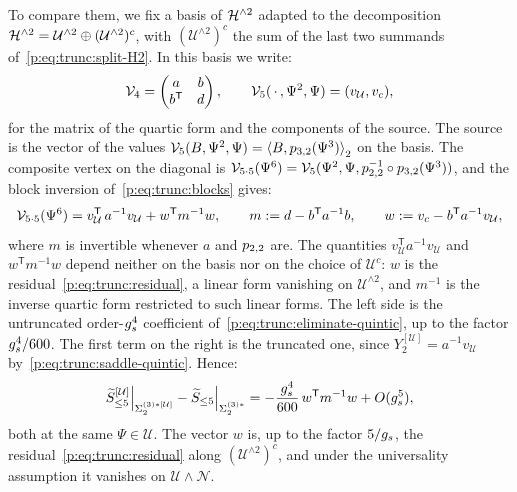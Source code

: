 To compare them, we fix a basis of $\Hn{2}$ adapted to the decomposition $\Hn{2} = \mathcal U^{\wedge 2} \oplus (\mathcal U^{\wedge 2})^c$, with $(\mathcal U^{\wedge 2})^c$ the sum of the last two summands of~\eqref{p:eq:trunc:split-H2}.
In this basis we write:
\begin{equation}
  \label{p:eq:trunc:blocks}
  \vertex{4}
    = \begin{pmatrix}
        a & b
        \\
        b^{\mathsf T} & d
      \end{pmatrix},
  \qquad
  \vertex{5}(\,\cdot\,, \Psi^2, \Psi)
    = (v_{\mathcal U}, v_c),
\end{equation}
for the matrix of the quartic form and the components of the source.
The source is the vector of the values $\vertex{5}(B, \Psi^2, \Psi) = \pair[2]{B}{\sprod{3}{2}(\Psi^3)}$ on the basis.
The composite vertex on the diagonal is $\vertex{5 \cdot 5}(\Psi^6) = \vertex{5}(\Psi^2, \Psi, \sprod{2}{2}^{-1} \circ \sprod{3}{2}(\Psi^3))$, and the block inversion of~\eqref{p:eq:trunc:blocks} gives:
\begin{equation}
  \label{p:eq:trunc:schur}
  \vertex{5 \cdot 5}(\Psi^6)
    = v_{\mathcal U}^{\mathsf T} \, a^{-1} v_{\mathcal U}
      + w^{\mathsf T} m^{-1} w,
  \qquad
  m
    := d - b^{\mathsf T} a^{-1} b,
  \qquad
  w
    := v_c - b^{\mathsf T} a^{-1} v_{\mathcal U},
\end{equation}
where $m$ is invertible whenever $a$ and $\sprod{2}{2}$ are.
The quantities $v_{\mathcal U}^{\mathsf T} a^{-1} v_{\mathcal U}$ and $w^{\mathsf T} m^{-1} w$ depend neither on the basis nor on the choice of $\mathcal U^c$: $w$ is the residual~\eqref{p:eq:trunc:residual}, a linear form vanishing on $\mathcal U^{\wedge 2}$, and $m^{-1}$ is the inverse quartic form restricted to such linear forms.
The left side is the untruncated order-$\gs^4$ coefficient of~\eqref{p:eq:trunc:eliminate-quintic}, up to the factor $\gs^4 / 600$.
The first term on the right is the truncated one, since $Y_2^{[\mathcal U]} = a^{-1} v_{\mathcal U}$ by~\eqref{p:eq:trunc:saddle-quintic}.
Hence:
\begin{equation}
  \label{p:eq:trunc:schur-difference}
  \caction[\le 5]^{[\mathcal U]} \Big|_{\Sigma_2^{(3)*[\mathcal U]}}
    - \caction[\le 5] \Big|_{\Sigma_2^{(3)*}}
    = - \frac{\gs^4}{600} \, w^{\mathsf T} m^{-1} w
      + O(\gs^5),
\end{equation}
both at the same $\Psi \in \mathcal U$.
The vector $w$ is, up to the factor $5 / \gs$, the residual~\eqref{p:eq:trunc:residual} along $(\mathcal U^{\wedge 2})^c$, and under the universality assumption it vanishes on $\mathcal U \wedge \mathcal N$.
